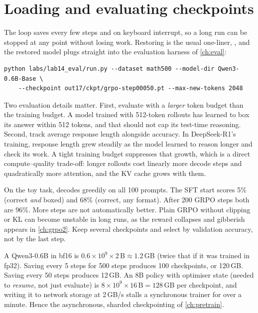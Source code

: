 \section{Loading and evaluating checkpoints}\label{sec:grpo:ckpt}

The loop saves  every few steps and on keyboard interrupt, so a
long run can be stopped at any point without losing work. Restoring is the usual one-liner,
, and the restored model plugs straight into
the evaluation harness of \cref{ch:eval}:

\begin{lstlisting}[style=shell,caption={Evaluating an RL checkpoint on MATH-500 with the Chapter 14 harness.},label={lst:grpo:eval}]
python labs/lab14_eval/run.py --dataset math500 --model-dir Qwen3-0.6B-Base \
    --checkpoint out17/ckpt/grpo-step00050.pt --max-new-tokens 2048
\end{lstlisting}

Two evaluation details matter. First, evaluate with a \emph{larger} token budget than the
training budget. A model trained with 512-token rollouts has learned to box its answer
within 512 tokens, and that should not cap its test-time reasoning. Second, track
average response length alongside accuracy. In DeepSeek-R1's training, response length
grew steadily as the model learned to reason longer and check its work. A tight training
budget suppresses that growth, which is a direct compute--quality trade-off: longer
rollouts cost linearly more decode steps and quadratically more attention, and the KV cache
grows with them.

On the toy task,  decodes greedily on all 100 prompts. The SFT
start scores 5\% (correct \emph{and} boxed) and 68\% (correct, any format). After 200 GRPO
steps both are 96\%. More steps are not automatically better. Plain GRPO without clipping
or KL can become unstable in long runs, as the reward collapses and gibberish appears in
\cref{ch:grpo2}. Keep several checkpoints and select by validation accuracy, not by the
last step.

\begin{napkinmath}
A Qwen3-0.6B  in bf16 is $0.6\times10^9\times2\,\text{B}\approx1.2$\,GB
(twice that if it was trained in fp32). Saving every 5 steps for
500 steps produces 100 checkpoints, or 120\,GB. Saving every 50 steps produces 12\,GB. An 8B
policy with optimiser state (needed to \emph{resume}, not just evaluate) is
$8\times10^9\times16\,\text{B}=128$\,GB per checkpoint, and writing it to network storage at
2\,GB/s stalls a synchronous trainer for over a minute. Hence the asynchronous, sharded
checkpointing of \cref{ch:pretrain}.
\end{napkinmath}


